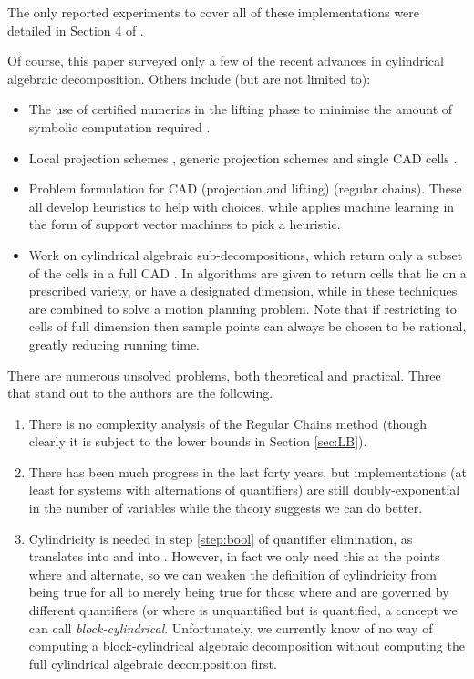 \documentclass[runningheads,a4paper]{llncs}
\begin{document}
\noindent The only reported experiments to cover all of these implementations were detailed in Section 4 of \cite{Bradfordetal2014b}.

Of course, this paper surveyed only a few of the recent advances in cylindrical algebraic decomposition.  Others include (but are not limited to):
\begin{itemize}
\item The use of certified numerics in the lifting phase to minimise the amount of symbolic computation required \cite{Strzebonski2006,IYAY13}.
\item Local projection schemes \cite{Strzebonski2014a}, generic projection schemes \cite{SS03} and single CAD cells \cite{Brown2013,JovanovicdeMoura2012a}.
\item Problem formulation for CAD \cite{Dolzmannetal2004a,Bradfordetal2013a,WEBD14} (projection and lifting) \cite{Englandetal2014c,EBCDMW14} (regular chains).  These all develop heuristics to help with choices, while \cite{Huangetal2014a} applies machine learning in the form of support vector machines to pick a heuristic.
\item Work on cylindrical algebraic sub-decompositions, which return only a subset of the cells in a full CAD \cite{Sei06}.  In \cite{WBDE14} algorithms are given to return cells that lie on a prescribed variety, or have a designated dimension, while in \cite{WDEB13} these techniques are combined to solve a motion planning problem.  Note that if restricting to cells of full dimension then sample points can always be chosen to be rational, greatly reducing running time.
\end{itemize}



There are numerous unsolved problems, both theoretical and practical.  Three that stand out to the authors are the following.
\begin{enumerate}
\item There is no complexity analysis of the Regular Chains method (though clearly it is subject to the lower bounds in Section \ref{sec:LB}).
\item There has been much progress in the last forty years, but implementations (at least for systems with alternations of quantifiers) are still doubly-exponential in the number of variables while the theory suggests we can do better.
\item Cylindricity is needed in step \ref{step:bool} of quantifier elimination, as  translates into  and  into . However, in fact we only need this at the points where  and  alternate, so we can weaken the definition of cylindricity from being true for all  to merely being true for those  where  and  are governed by different quantifiers (or where  is unquantified but  is quantified, a concept we can call \emph{block-cylindrical}. Unfortunately, we currently know of no way of computing a block-cylindrical algebraic decomposition without computing the full cylindrical algebraic decomposition first.
\end{enumerate}
\end{document}
